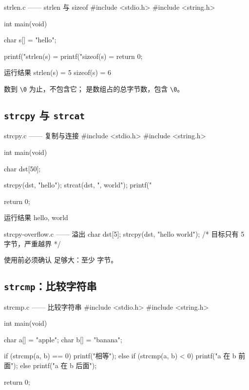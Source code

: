 \begin{codebox}{strlen.c —— strlen 与 sizeof}
#include <stdio.h>
#include <string.h>

int main(void)
{
    char s[] = "hello";

    printf("strlen(s) = %
    printf("sizeof(s) = %
    return 0;
}
\end{codebox}

\begin{outbox}{运行结果}
strlen(s) = 5
sizeof(s) = 6
\end{outbox}

 数到 \texttt{\textbackslash0} 为止，不包含它； 是数组占的总字节数，包含 \texttt{\textbackslash0}。

\subsection{\texttt{strcpy} 与 \texttt{strcat}}

\begin{codebox}{strcpy.c —— 复制与连接}
#include <stdio.h>
#include <string.h>

int main(void)
{
    char dst[50];

    strcpy(dst, "hello");
    strcat(dst, ", world");
    printf("%

    return 0;
}
\end{codebox}

\begin{outbox}{运行结果}
hello, world
\end{outbox}

\begin{pitfall}
\begin{codebox}{strcpy-overflow.c —— 溢出}
char dst[5];
strcpy(dst, "hello world");   /* 目标只有 5 字节，严重越界 */
\end{codebox}
使用前必须确认  足够大：至少  字节。
\end{pitfall}

\subsection{\texttt{strcmp}：比较字符串}

\begin{codebox}{strcmp.c —— 比较字符串}
#include <stdio.h>
#include <string.h>

int main(void)
{
    char a[] = "apple";
    char b[] = "banana";

    if (strcmp(a, b) == 0) {
        printf("相等\n");
    } else if (strcmp(a, b) < 0) {
        printf("a 在 b 前面\n");
    } else {
        printf("a 在 b 后面\n");
    }

    return 0;
}
\end{codebox}


